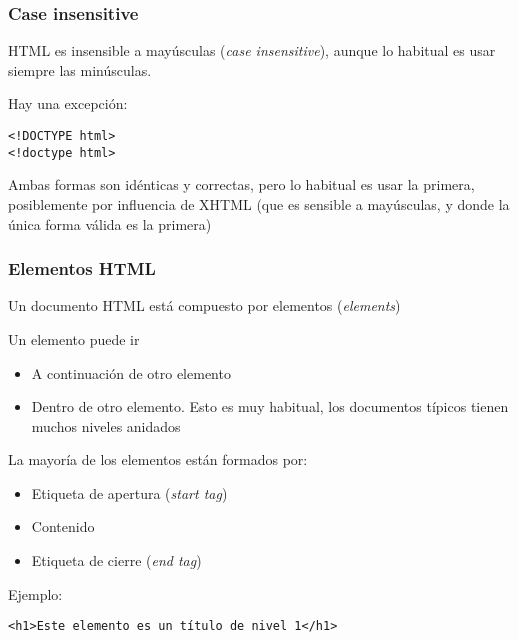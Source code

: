 \documentclass[ucs]{beamer}
\begin{document}
\begin{frame}[fragile]
\frametitle{Case insensitive}
HTML es insensible a mayúsculas (\emph{case insensitive}), aunque lo habitual es usar siempre las
minúsculas.

Hay una excepción:

  \begin{footnotesize}
  \begin{verbatim}
<!DOCTYPE html>
<!doctype html>
  \end{verbatim}
  \end{footnotesize}

Ambas formas son idénticas y correctas, pero lo habitual es usar la primera, posiblemente 
por influencia de XHTML (que es sensible a mayúsculas, y donde la única
forma válida es la primera)

\end{frame}





\begin{frame}[fragile]
\frametitle{Elementos HTML}
Un documento HTML está compuesto por elementos (\emph{elements})

Un elemento puede ir
    \begin{itemize}
\item
A continuación de otro elemento
\item
Dentro de otro elemento. Esto es muy habitual, los documentos típicos tienen muchos niveles anidados
    \end{itemize}

La mayoría de los elementos están formados por:
    \begin{itemize}
\item
 Etiqueta de apertura
(\emph{start tag})
\item
Contenido
\item
 Etiqueta de cierre 
(\emph{end tag})
    \end{itemize}

Ejemplo:

\verb|<h1>Este elemento es un título de nivel 1</h1>|

\end{frame}
\end{document}

